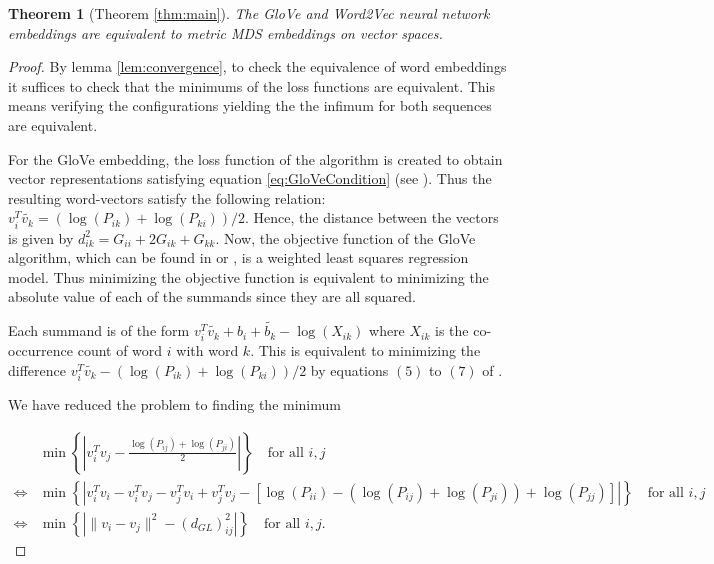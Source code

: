 \documentclass[10pt,a4paper]{elsarticle}
\newtheorem{theorem}{Theorem}[section]
\begin{document}
{	
	
	
	\begin{theorem}[Theorem \ref{thm:main}]\label{thm:mainA}
		The GloVe and Word2Vec neural network embeddings are equivalent to metric MDS embeddings on vector spaces.
	\end{theorem}
	
	
	
	
	\begin{proof}
		By lemma \ref{lem:convergence}, to check the equivalence of word embeddings it suffices to check that the minimums of the loss functions are equivalent. This means verifying the configurations yielding the the infimum for both sequences are equivalent.
		
		For the GloVe embedding, the loss function of the algorithm is created to obtain vector representations satisfying equation \eqref{eq:GloVeCondition} (see \cite[Equation (5)]{pennington2014glove}). Thus the resulting word-vectors satisfy the following relation: $v_i^{T}\tilde{v_k}=(\log(P_{ik})+\log(P_{ki}))/2$. Hence, the distance between the vectors is given by $d^{2}_{ik}=G_{ii}+2G_{ik}+G_{kk}$. Now, the objective function of the GloVe algorithm, which can be found in \cite[Equation (8)]{pennington2014glove} or  \cite[Section 5.1]{hashimoto2016word}, is a weighted least squares regression model. Thus minimizing the objective function is equivalent to minimizing the absolute value of each of the summands since they are all squared.
		
		Each summand is of the form $v_i^{T}\tilde{v_k}+b_{i}+\tilde{b_k}-\log(X_{ik})$ where $X_{ik}$ is the co-occurrence count of word $i$ with word $k$. This is equivalent to minimizing the difference $v_i^{T}\tilde{v_k}-(\log(P_{ik})+\log(P_{ki}))/2$ by equations $(5)$ to $(7)$ of \cite{pennington2014glove}.
		
		We have reduced the problem to finding the minimum  									
		
		\begin{align}
			&\min\left\{ \left|v_{i}^{T}v_{j}-\frac{\log(P_{ij})+\log(P_{ji})}{2}\right|\right\}\quad\text{for all $i,j$}\\
			\Leftrightarrow &\min\left\{ |v_{i}^{T}v_{i}-v_{i}^{T}v_{j}-v_{j}^{T}v_{i}+v_{j}^{T}v_{j}-\left[\log(P_{ii})-(\log(P_{ij})+\log(P_{ji}))+\log(P_{jj}) \right] |\right\}\quad\text{for all $i,j$} \\
			\Leftrightarrow &\min\left\{|\|v_i-v_j\|^{2}- (d_{GL})^{2}_{ij}|\right\} \quad\text{for all $i,j$}.
		\end{align}
		

\end{proof}}
\end{document}
